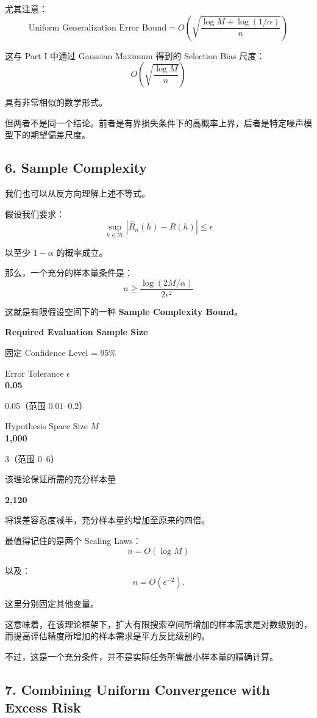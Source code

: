 尤其注意：
\[\boxed{
\text{Uniform Generalization Error Bound}
=
O\left(
\sqrt{\frac{\log M+\log(1/\alpha)}n}
\right)
}\]

这与 Part I 中通过 Gaussian Maximum 得到的 Selection Bias 尺度：
\[O\left(\sqrt{\frac{\log M}{n}}\right)\]

具有非常相似的数学形式。

但两者不是同一个结论。前者是有界损失条件下的高概率上界，后者是特定噪声模型下的期望偏差尺度。

\hypertarget{part-2-14-0001-sample-complexity}{%
\subsection{6. Sample Complexity}\label{part-2-14-0001-sample-complexity}}

我们也可以从反方向理解上述不等式。

假设我们要求：
\[\sup_{h\in\mathcal H}
|\widehat R_n(h)-R(h)|
\leq\epsilon\]

以至少 \(1-\alpha\) 的概率成立。

那么，一个充分的样本量条件是：
\[\boxed{
n\geq
\frac{\log(2M/\alpha)}{2\epsilon^2}
}\]

这就是有限假设空间下的一种 \textbf{Sample Complexity Bound}。

\textbf{Required Evaluation Sample Size}

固定 Confidence Level = 95\%

Error Tolerance \(\epsilon\)\\
\textbf{0.05}

0.05（范围 0.01--0.2）

Hypothesis Space Size \(M\)\\
\textbf{1,000}

3（范围 0--6）

该理论保证所需的充分样本量

\textbf{2,120}

将误差容忍度减半，充分样本量约增加至原来的四倍。

最值得记住的是两个 Scaling Laws：
\[n=O(\log M)\]

以及：
\[n=O(\epsilon^{-2}).\]

这里分别固定其他变量。

这意味着，在该理论框架下，扩大有限搜索空间所增加的样本需求是对数级别的，而提高评估精度所增加的样本需求是平方反比级别的。

不过，这是一个充分条件，并不是实际任务所需最小样本量的精确计算。

\hypertarget{part-2-14-0001-combining-uniform-convergence-with-excess-risk}{%
\subsection{7. Combining Uniform Convergence with Excess Risk}\label{part-2-14-0001-combining-uniform-convergence-with-excess-risk}}

